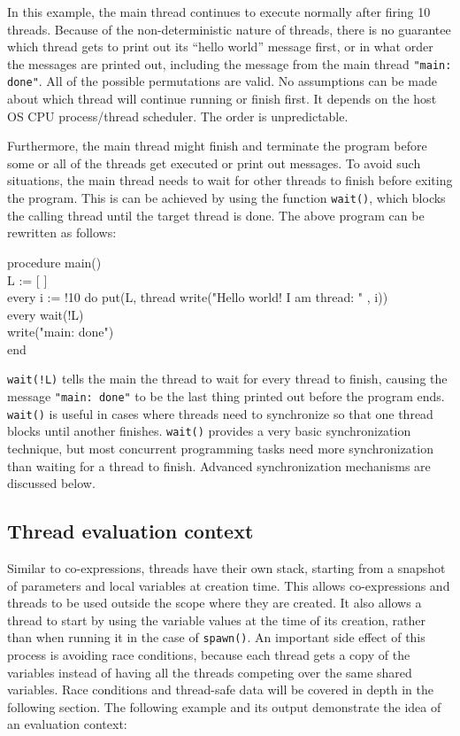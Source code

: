 In this example, the main thread continues to execute normally after
firing 10 threads. Because of the non-deterministic nature of threads,
there is no guarantee which thread gets to print out its ``hello
world'' message first, or in what order the messages are printed out,
including the message from the main thread \texttt{"main: done"}.  All
of the possible permutations are valid. No assumptions can be made
about which thread will continue running or finish first.  It depends
on the host OS CPU process/thread scheduler. The order is
unpredictable.

Furthermore, the main thread might finish and terminate the program
before some or all of the threads get executed or print out messages.
To avoid such situations, the main thread needs to wait for other
threads to finish before exiting the program. This is can be achieved
by using the function \texttt{wait()}, which blocks the calling thread
until the target thread is done. The above program can be rewritten as
follows:

\begin{icode}
procedure main() \\
\> L := [ ] \\
\> every i := !10 do put(L, thread write("Hello world! I am thread: " , i)) \\
\> every wait(!L) \\
\> write("main: done") \\
end
\end{icode}

\noindent
\texttt{wait(!L)} tells the main the thread to wait for every thread
to finish, causing the message \texttt{"main: done"} to be the last
thing printed out before the program ends. \texttt{wait()} is useful
in cases where threads need to synchronize so that one thread blocks
until another finishes. \texttt{wait()} provides a very basic
synchronization technique, but most concurrent programming tasks need
more synchronization than waiting for a thread to finish.  Advanced
synchronization mechanisms are discussed below.


\subsection{Thread evaluation context}

Similar to co-expressions, threads have their own stack, starting from
a snapshot of parameters and local variables at creation time. This
allows co-expressions and threads to be used outside the scope where
they are created. It also allows a thread to start by using the
variable values at the time of its creation, rather than when running
it in the case of \texttt{spawn()}.  An important side effect of this
process is avoiding race conditions, because each thread gets a copy
of the variables instead of having all the threads competing over the
same shared variables. Race conditions and thread-safe data will be
covered in depth in the following section. The following example and
its output demonstrate the idea of an evaluation context:

